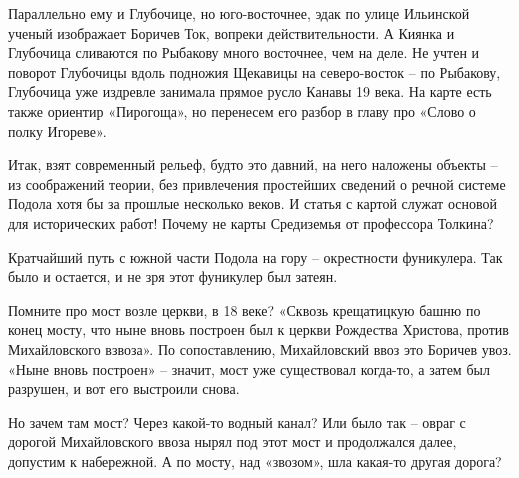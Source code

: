 Параллельно ему и Глубочице, но юго-восточнее, эдак по улице Ильинской ученый изображает Боричев Ток, вопреки действительности. А Киянка и Глубочица сливаются по Рыбакову много восточнее, чем на деле. Не учтен и поворот Глубочицы вдоль подножия Щекавицы на северо-восток – по Рыбакову, Глубочица уже издревле занимала прямое русло Канавы 19 века. На карте есть также ориентир «Пирогоща», но перенесем его разбор в главу про «Слово о полку Игореве». 

Итак, взят современный рельеф, будто это давний, на него наложены объекты – из соображений теории, без привлечения простейших сведений о речной системе Подола хотя бы за прошлые несколько веков. И статья с картой служат основой для исторических работ! Почему не карты Средиземья от профессора Толкина?

Кратчайший путь с южной части Подола на гору – окрестности фуникулера. Так было и остается, и не зря этот фуникулер был затеян.



Помните про мост возле церкви, в 18 веке? «Сквозь крещатицкую башню по конец мосту, что ныне вновь построен был к церкви Рождества Христова, против Михайловского взвоза». По сопоставлению, Михайловский ввоз это Боричев увоз. «Ныне вновь построен» – значит, мост уже существовал когда-то, а затем был разрушен, и вот его выстроили снова.

Но зачем там мост? Через какой-то водный канал? Или было так – овраг с дорогой Михайловского ввоза нырял под этот мост и продолжался далее, допустим к набережной. А по мосту, над «звозом», шла какая-то другая дорога?






